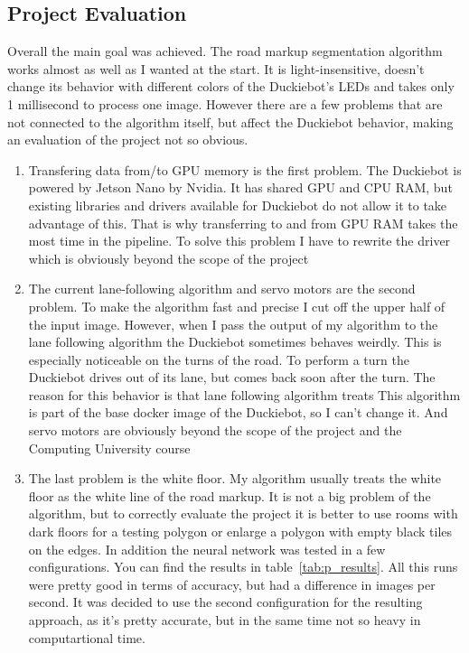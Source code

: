 \subsection{Project Evaluation}
Overall the main goal was achieved. The road markup segmentation algorithm works almost as well as I wanted at the start. 
It is light-insensitive, doesn't change its behavior with different colors of the Duckiebot's LEDs and takes only 1 millisecond to process one image.
However there are a few problems that are not connected to the algorithm itself, but affect the Duckiebot behavior, 
making an evaluation of the project not so obvious.
\begin{enumerate}
    \item Transfering data from/to GPU memory is the first problem. The Duckiebot is powered by Jetson Nano by Nvidia. It has shared GPU and CPU RAM, but 
    existing libraries and drivers available for Duckiebot do not allow it to take advantage of this. That is why transferring to and from GPU RAM takes 
    the most time in the pipeline. To solve this problem I have to rewrite the driver which is obviously beyond the scope of the project
    \item The current lane-following algorithm and servo motors are the second problem. To make the algorithm fast and precise I cut off the upper half of the input 
    image. However, when I pass the output of my algorithm to the lane following algorithm the Duckiebot sometimes behaves weirdly. 
    This is especially noticeable on the turns of the road. To perform a turn the Duckiebot drives out of its lane, but comes back soon after the turn. 
    The reason for this behavior is that lane following algorithm treats 
    This algorithm is part of the base docker image of the Duckiebot, so I can't change it. And servo motors are obviously beyond the scope of the project 
    and the Computing University course
    \item The last problem is the white floor. My algorithm usually treats the white floor as the white line of the road markup. It is not a big problem of 
    the algorithm, but to correctly evaluate the project it is better to use rooms with dark floors for a testing polygon or enlarge a polygon with empty black tiles 
    on the edges. 
In addition the neural network was tested in a few configurations. You can find the results in table~\ref{tab:p_results}. All this runs were pretty good in terms of accuracy, 
but had a difference in images per second. It was decided to use the second configuration for the resulting approach, as it's pretty accurate, but in the same time 
not so heavy in computartional time.


\end{enumerate}
